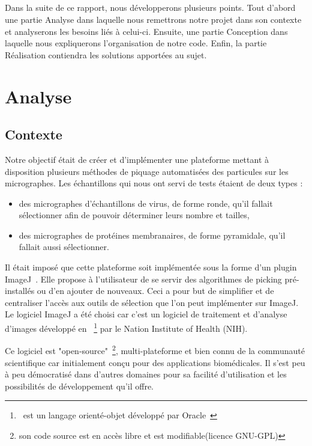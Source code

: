 \documentclass[12pt,a4paper]{report}
\begin{document}
\paragraph*{}
Dans la suite de ce rapport, nous développerons plusieurs points. Tout d'abord une partie Analyse dans laquelle nous remettrons notre projet dans son contexte et analyserons les besoins liés à celui-ci. Ensuite, une partie Conception dans laquelle nous expliquerons l'organisation de notre code. Enfin, la partie Réalisation contiendra les solutions apportées au sujet.

\chapter{Analyse}

\section{Contexte}

\noindent
Notre objectif était de créer et d'implémenter une plateforme mettant à disposition plusieurs méthodes de piquage automatisées des particules sur les micrographes. Les échantillons qui nous ont servi de tests étaient de deux types :%
\begin{itemize}
\item des micrographes d'échantillons de virus, de forme ronde, qu'il fallait sélectionner afin de pouvoir déterminer leurs nombre et tailles,
\item des micrographes de protéines membranaires, de forme pyramidale, qu'il fallait aussi sélectionner.\\
\end{itemize}
\noindent
Il était imposé que cette plateforme soit implémentée sous la forme d'un plugin ImageJ~\cite{imagej:url}. Elle propose à l'utilisateur de se servir des algorithmes de picking pré-installés ou d'en ajouter de nouveaux. Ceci a pour but de simplifier et de centraliser l'accès aux outils de sélection que l'on peut implémenter sur ImageJ.\\%

\noindent
Le logiciel ImageJ a été choisi car c'est un logiciel de traitement et d'analyse d'images développé en \java~\footnote{\java\ est un langage orienté-objet développé par Oracle~\cite{java:url}} par le Nation Institute of Health (NIH).%

\noindent
Ce logiciel est "open-source"~\footnote{son code source est en accès libre et est modifiable(licence GNU-GPL)}, multi-plateforme et bien connu de la communauté scientifique car initialement conçu pour des applications biomédicales. Il s'est peu à peu démocratisé dans d'autres domaines pour sa facilité d'utilisation et les possibilités de développement qu'il offre.%
\end{document}
